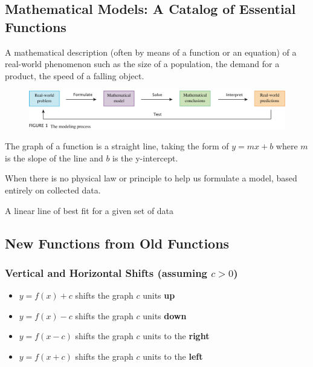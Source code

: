 \documentclass[11pt]{article}
\theoremstyle{plain}
\theoremstyle{definition}
\begin{document}
\subsection{Mathematical Models: A Catalog of Essential Functions}
\begin{description}[style=nextline]
	\item[Mathematical model] A mathematical description (often by means of a function or an equation) of a real-world phenomenon such as the size of a population, the demand for a product, the speed of a falling object.
\end{description}
\begin{figure}[h]
	\includegraphics{images/12-fig1}	
\end{figure}
\begin{description}[style=nextline]
	\item[Linear function] The graph of a function is a straight line, taking the form of $y=mx+b$ where $m$ is the slope of the line and $b$ is the y-intercept.
	\item[Empirical model] When there is no physical law or principle to help us formulate a model, based entirely on collected data.
	\item[Linear regression model] A linear line of best fit for a given set of data
\end{description}

\subsection{New Functions from Old Functions}

\subsubsection{Vertical and Horizontal Shifts (assuming $c>0$)}

\begin{itemize}
	\item $y=f(x)+c$ shifts the graph $c$ units \textbf{up}
	\item $y=f(x)-c$ shifts the graph $c$ units \textbf{down}
	\item $y=f(x-c)$ shifts the graph $c$ units to the \textbf{right}
	\item $y=f(x+c)$ shifts the graph $c$ units to the \textbf{left}	
\end{itemize}
\end{document}
